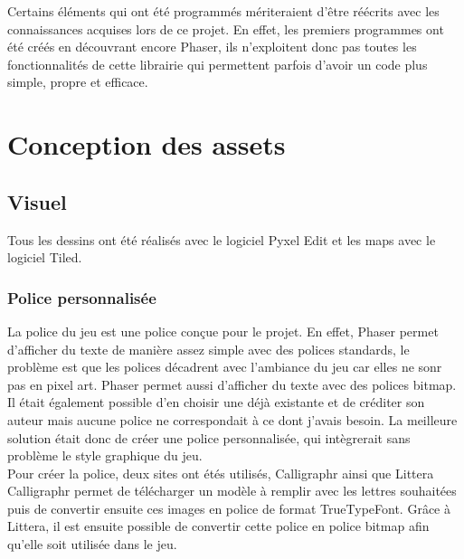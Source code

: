 \documentclass[11pt]{article}
\begin{document}
Certains éléments qui ont été programmés mériteraient d'être réécrits avec les connaissances acquises lors de ce projet. En effet, les premiers programmes ont été créés en découvrant encore Phaser, ils n'exploitent donc pas toutes les fonctionnalités de cette librairie qui permettent parfois d'avoir un code plus simple, propre et efficace.\\

\section{Conception des assets}
\subsection{Visuel}
Tous les dessins ont été réalisés avec le logiciel Pyxel Edit et les maps avec le logiciel Tiled.
\subsubsection{Police personnalisée}
La police du jeu est une police conçue pour le projet. En effet, Phaser permet d'afficher du texte de manière assez simple avec des polices standards, le problème est que les polices décadrent avec l'ambiance du jeu car elles ne sonr pas en pixel art. Phaser permet aussi d'afficher du texte avec des polices bitmap. Il était également possible d'en choisir une déjà existante et de créditer son auteur mais aucune police ne correspondait à ce dont j'avais besoin. La meilleure solution était donc de créer une police personnalisée, qui intègrerait sans problème le style graphique du jeu. \\

Pour créer la police, deux sites ont étés utilisés, Calligraphr ainsi que Littera\\ Calligraphr permet de télécharger un modèle à remplir avec les lettres souhaitées puis de convertir ensuite ces images en police de format TrueTypeFont. Grâce à Littera, il est ensuite possible de convertir cette police en police bitmap afin qu'elle soit utilisée dans le jeu.\\
\end{document}
